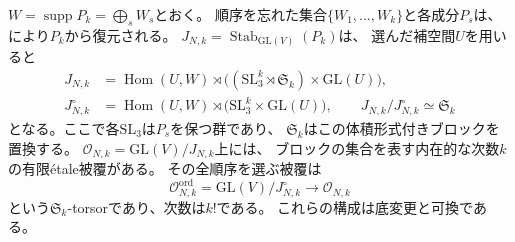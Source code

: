 \begin{lemma}[安定化群と順序付きブロック被覆]
\label{lem:pg-intrinsic-block-cover}
$W=\operatorname{supp}P_k=\bigoplus_sW_s$とおく。
順序を忘れた集合$\{W_1,\ldots,W_k\}$と各成分$P_s$は、
\cite[縮約二形式による復元補題]{PoissonCubic}により$P_k$から復元される。
$J_{N,k}=\operatorname{Stab}_{\mathrm{GL}(V)}(P_k)$は、
選んだ補空間$U$を用いると
\begin{equation}
 \begin{aligned}
 J_{N,k}
  &=\operatorname{Hom}(U,W)\rtimes
     \bigl((\mathrm{SL}_3^k\rtimes\mathfrak S_k)
                   \times\mathrm{GL}(U)\bigr),\\
 J_{N,k}^{\circ}
  &=\operatorname{Hom}(U,W)\rtimes
     \bigl(\mathrm{SL}_3^k\times\mathrm{GL}(U)\bigr),
 \qquad J_{N,k}/J_{N,k}^{\circ}\simeq\mathfrak S_k
 \end{aligned}
 \label{eq:pg-intrinsic-multiblock-stabilizer}
\end{equation}
となる。ここで各$\mathrm{SL}_3$は$P_s$を保つ群であり、
$\mathfrak S_k$はこの体積形式付きブロックを置換する。
$\mathcal O_{N,k}=\mathrm{GL}(V)/J_{N,k}$上には、
ブロックの集合を表す内在的な次数$k$の有限\'etale被覆がある。
その全順序を選ぶ被覆は
\begin{equation}
 \mathcal O_{N,k}^{\mathrm{ord}}
   =\mathrm{GL}(V)/J_{N,k}^{\circ}
   \longrightarrow\mathcal O_{N,k}
 \label{eq:pg-intrinsic-ordered-block-cover}
\end{equation}
という$\mathfrak S_k$-torsorであり、次数は$k!$である。
これらの構成は底変更と可換である。
\end{lemma}
